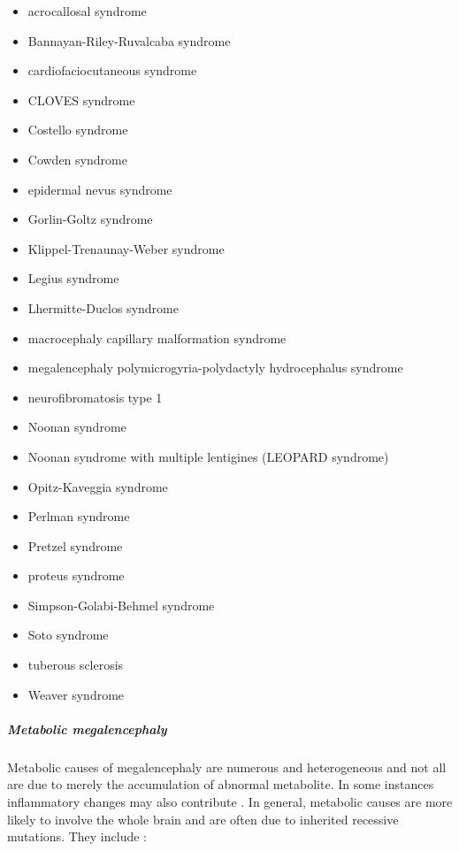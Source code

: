 \begin{itemize}
	\item
	acrocallosal syndrome
	\item
	Bannayan-Riley-Ruvalcaba syndrome
	\item
	cardiofaciocutaneous syndrome
	\item
	CLOVES syndrome
	\item
	Costello syndrome
	\item
	Cowden syndrome
	\item
	epidermal nevus syndrome
	\item
	Gorlin-Goltz syndrome
	\item
	Klippel-Trenaunay-Weber syndrome
	\item
	Legius syndrome
	\item
	Lhermitte-Duclos syndrome
	\item
	macrocephaly capillary malformation syndrome
	\item
	megalencephaly polymicrogyria-polydactyly hydrocephalus syndrome
	\item
	neurofibromatosis type 1
	\item
	Noonan syndrome
	\item
	Noonan syndrome with multiple lentigines (LEOPARD syndrome)
	\item
	Opitz-Kaveggia syndrome
	\item
	Perlman syndrome
	\item
	Pretzel syndrome
	\item
	proteus syndrome
	\item
	Simpson-Golabi-Behmel syndrome
	\item
	Soto syndrome
	\item
	tuberous sclerosis
	\item
	Weaver syndrome
\end{itemize}

\subparagraph{Metabolic megalencephaly}

Metabolic causes of megalencephaly are numerous and heterogeneous and not all are due to merely the accumulation of abnormal metabolite. In some instances inflammatory changes may also contribute . In general, metabolic causes are more likely to involve the whole brain and are often due to inherited recessive mutations. They include :

